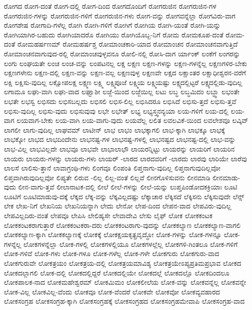 {ರೋಗದ
ರೋಗ-ದಂತೆ
ರೋಗ-ದಲ್ಲಿ
ರೋಗ-ದಿಂದ
ರೋಗದೊಂದಿಗೆ
ರೋಗರುಜಿನ
ರೋಗರುಜಿನ-ಗಳ
ರೋಗರುಜಿನ-ಗಳನ್ನು
ರೋಗರುಜಿನ-ಗಳಿಗೆ
ರೋಗರುಜಿನ-ಗಳು
ರೋಗ-ವನ್ನು
ರೋಗವನ್ನೆಲ್ಲಾ
ರೋಗವಿರು-ವಾಗ
ರೋಗಶೇಷ
ರೋಗಾದಿ-ಗಳೆಲ್ಲ
ರೋಗಿ
ರೋಗಿ-ಗಳಿಗೆ
ರೋಗಿಗೆ
ರೋಗಿಯ
ರೋಗಿ-ಯಂತೆ
ರೋಗಿ-ಯನ್ನು
ರೋಗಿಯಾಗಿರ-ಬಹುದು
ರೋಗಿಯಾದರೊ
ರೋಗಿಯು
ರೋಗಿಯೊಬ್ಬ-ನಿಗೆ
ರೋಮ
ರೋಮಕೂಪ-ದಂತೆ
ರೋಮ-ದಂತೆ
ರೋಮಹರ್ಷಣಮ್
ರೋಮಹರ್ಷಶ್ಚ
ರೋಮಾಂಚಕಾರಿ-ಯಾದ
ರೋಮಾಂಚನ
ರೋಮಾಂಚನವಾಗುತ್ತಿದೆ
ರೋಮಾಂಚನವಾಗುವುದ-ರಲ್ಲಿ
ರೋಮಾಂಚವುಳ್ಳವನೂ
ರೋಲಿ-ನಲ್ಲಿ
ರೋಸಿ-ದಾಗ
ರ್ಯಾಂಕ್
ಲಂಕೆಗೆ
ಲಂಗರನ್ನು
ಲಂಗು
ಲಂಘಯತೇ
ಲಂಚ
ಲಂಚ-ವನ್ನು
ಲಂಪಟನಲ್ಲ
ಲಕ್ಷ
ಲಕ್ಷಣ
ಲಕ್ಷಣ-ಗಳನ್ನು
ಲಕ್ಷಣ-ಗಳನ್ನೆಲ್ಲ
ಲಕ್ಷಣಗಳಿರ-ಬೇಕು
ಲಕ್ಷಣಗಳೇನು
ಲಕ್ಷಣ-ದಲ್ಲಿ
ಲಕ್ಷಣ-ವನ್ನು
ಲಕ್ಷಣ-ವಲ್ಲ
ಲಕ್ಷಣವುಳ್ಳ
ಲಕ್ಷಣವೇ
ಲಕ್ಷದ
ಲಕ್ಷಾಂತರ
ಲಕ್ಷಾಧೀಶ್ವರನ-ವರೆಗೆ
ಲಕ್ಷಿ
ಲಕ್ಷಿಸು-ವುದಿಲ್ಲ
ಲಕ್ಷೋಪಲಕ್ಷ
ಲಕ್ಷ್ಮಣ
ಲಕ್ಷ್ಮಿ
ಲಕ್ಷ್ಮಿಪೂಜೆ
ಲಕ್ಷ್ಮಿಯ
ಲಕ್ಷ್ಮಿಯಷ್ಟು
ಲಕ್ಷ್ಯದಲ್ಲಿಟ್ಟರೆ
ಲಕ್ಷ್ಯದಲ್ಲಿಡು-ವುದಿಲ್ಲ
ಲಗಾಮೂ
ಲಘು-ವಾಗಿ
ಲಘು-ವಾದ
ಲಘ್ವಾಶೀ
ಲಜ್ಜೆ-ಯಿಂದ
ಲಜ್ಜೆಯಿಲ್ಲ
ಲಟು
ಲಬ್ಧ
ಲಬ್ಧಮಿದಂ
ಲಬ್ಧ್ವಾ
ಲಭಂತೇ
ಲಭತೇ
ಲಭಸ್ವ
ಲಭಿಸದು
ಲಭಿಸಬಲ್ಲದು
ಲಭಿಸಲಿ
ಲಭಿಸ-ಲಿಲ್ಲ
ಲಭಿಸಿದರೂ
ಲಭಿಸಿದೆ
ಲಭಿಸು-ತ್ತದೆ
ಲಭಿಸು-ತ್ತವೆ
ಲಭಿಸು-ವುದಿಲ್ಲ
ಲಭಿಸು-ವುದು
ಲಭಿಸುವುವು
ಲಭೇ
ಲಭೇತ್
ಲಭ್ಯ
ಲಭ್ಯಸ್ತ್ವನನ್ಯಯಾ
ಲಯ-ಗಳಿಗೆ
ಲಯ-ದಲ್ಲಿ
ಲಯ-ವಾಗ
ಲಯವಾಗ-ಬೇಕು
ಲಯ-ವಾಗಿ
ಲಯ-ವಾಗು-ವುದು
ಲಯವೆಲ್ಲ
ಲಲಿತ
ಲವಲವಿಕೆ-ಯಿಂದ
ಲವಲೇಶವೂ
ಲವ್ಕಿವ್
ಲಾಗಲೀ
ಲಾಗು-ವುದಿಲ್ಲ
ಲಾಘವಮ್
ಲಾಟೀನ್
ಲಾಭ
ಲಾಭಂ
ಲಾಭಕ್ಕಾಗಲಿ
ಲಾಭ-ಕ್ಕಾಗಿ
ಲಾಭಕ್ಕೂ
ಲಾಭಕ್ಕೆ
ಲಾಭಕ್ಕೋ
ಲಾಭದ
ಲಾಭದಿಂದೇನು
ಲಾಭನಷ್ಟ-ಗಳ
ಲಾಭನಷ್ಟ-ಗಳಲ್ಲಿ
ಲಾಭನಷ್ಟದ
ಲಾಭನಷ್ಟ-ದಲ್ಲಿ
ಲಾಭ-ವನ್ನು
ಲಾಭ-ವಿಲ್ಲ
ಲಾಭವಿಲ್ಲದೇ
ಲಾಭವೂ
ಲಾಭವೇ
ಲಾಭಾಲಾಭೌ
ಲಾಯರನ್ನಿಟ್ಟು
ಲಾಯರನ್ನು
ಲಾಯರಿಗೆ
ಲಾಯರಿನ
ಲಾಯರು
ಲಾಯರು-ಗಳನ್ನು
ಲಾಯರು-ಗಳು
ಲಾಯರ್
-ಲಾರದ
ಲಾರದವರಿಗೆ
-ಲಾರದು
ಲಾರವು
ಲಾರಿಯೇ
ಲಾರೆವು
ಲಾಲಸೆ
ಲಾಲಿಸು-ತ್ತಾನೆ
ಲಾವಾಗ್ರಂಥಿ-ಗಳು
ಲಿಂಗವೂ
ಲಿಂಪಂತಿ
ಲಿಪ್ತನಾಗು-ವುದಿಲ್ಲ
ಲಿಪ್ತನಾಗುವುದಿಲ್ಲವೋ
ಲಿಪ್ತವಾಗಿರುವುದಿಲ್ಲವೋ
ಲಿಪ್ಯತೇ
ಲಿರುವ
-ಲಿಲ್ಲ
ಲಿಲ್ಲ-ವಂತೆ
ಲಿಲ್ಲವೆ
ಲೀನಗೊಳಿಸುವನು
ಲೀನಮಾಡಿ
ಲೀನಮಾಡು-ವುದು
ಲೀನ-ವಾಗು-ತ್ತವೆ
ಲೀಲಾನಾಟಕ-ದಲ್ಲಿ
ಲೀಲೆ
ಲೀಲೆ-ಗಳನ್ನು
ಲೀಲೆ-ಯನ್ನು
ಲುಪ್ತಪಿಂಡೋದಕಕ್ರಿಯಾಃ
ಲೂಟಿ
ಲೂಟಿಗೆ
ಲೂಟಿಮಾಡುವು-ದಕ್ಕೆ
ಲೆಕ್ಕದ
ಲೆಕ್ಕ-ವನ್ನು
ಲೆಕ್ಕವಿಲ್ಲದಷ್ಟು
ಲೆಕ್ಕಾಚಾರ
ಲೆಕ್ಕಿಸದೆ
ಲೆಕ್ಕಿಸನು
ಲೆಕ್ಕಿಸುವುದೇ
ಲೆನ್ಸ್
ಲೇಕ
ಲೇಖ-ನಿಗೆ
ಲೇಖನಿಯ
ಲೇಖನಿಯನ್ನಾಗಿ
ಲೇದು
ಲೇನೋ
ಲೇಪ-ದಿಂದ
ಲೇಪನ-ವಾದ
ಲೇಪವಿರು-ವುದಿಲ್ಲ
ಲೇಪವಿಲ್ಲದಿರು-ವಂತೆ
ಲೇಪವೂ
ಲೇಪಿಸಿ
ಲೇಲಿಹ್ಯಸೇ
ಲೇವಾದೇವಿ
ಲೇಸು
ಲೈಫ್
ಲೋಕ
ಲೋಕಕಂಟಕ
ಲೋಕಕಂಟಕರಾಗುತ್ತಾರೆ
ಲೋಕಕಂಟಕರಾ-ದರು
ಲೋಕಕಂಟರಾಗು-ವುದನ್ನು
ಲೋಕಕಲ್ಯಾಣ
ಲೋಕಕಲ್ಯಾಣ-ವಾಗಲಿ
ಲೋಕಕಲ್ಯಾಣ-ಕ್ಕಾಗಿ
ಲೋಕಕಲ್ಯಾಣಕ್ಕೆ
ಲೋಕಕ್ಕೆ
ಲೋಕಕ್ಷಯಕೃತ್ಪ್ರವೃದ್ಧೋ
ಲೋಕ-ಗಳನ್ನು
ಲೋಕ-ಗಳನ್ನೂ
ಲೋಕ-ಗಳನ್ನೆಲ್ಲ
ಲೋಕಗಳನ್ನೆಲ್ಲಾ
ಲೋಕ-ಗಳಲ್ಲಿ
ಲೋಕಗಳಲ್ಲಿಯೂ
ಲೋಕಗಳಲ್ಲೆಲ್ಲ
ಲೋಕಗಳಿ-ಗಿಂತಲೂ
ಲೋಕ-ಗಳಿಗೆ
ಲೋಕ-ಗಳಿವೆ
ಲೋಕ-ಗಳು
ಲೋಕ-ಗಳೂ
ಲೋಕ-ಗಳೆಲ್ಲ
ಲೋಕ-ಗಳೇ
ಲೋಕಗುರು
ಲೋಕಗುರು-ವಾದ
ಲೋಕಗುರುವೇ
ಲೋಕತ್ರಯಂ
ಲೋಕತ್ರಯ-ದಲ್ಲಿ
ಲೋಕತ್ರಯಮಾವಿಶ್ಯ
ಲೋಕತ್ರಯೇಽಪ್ಯಪ್ರತಿಮಪ್ರಭಾವ
ಲೋಕದ
ಲೋಕದಲ್ಲಾಗಲಿ
ಲೋಕ-ದಲ್ಲಿ
ಲೋಕದಲ್ಲಿದ್ದರೆ
ಲೋಕದಲ್ಲಿಯೇ
ಲೋಕದಲ್ಲೆ
ಲೋಕದಲ್ಲೊ
ಲೋಕದಿಂದಲೂ
ಲೋಕಪಾಲಕ-ನಾದ
ಲೋಕಮಹೇಶ್ವರಮ್
ಲೋಕಮಿಮಂ
ಲೋಕಲೀಲೆಯ
ಲೋಕ-ವನ್ನು
ಲೋಕವನ್ನೆಲ್ಲ
ಲೋಕವನ್ನೇ
ಲೋಕ-ವಿಲ್ಲ
ಲೋಕವಿಲ್ಲ-ವೆಂದು
ಲೋಕವೂ
ಲೋಕ-ವೆಂದರೆ
ಲೋಕವೇ
ಲೋಕವೋ
ಲೋಕವ್ಯವಹಾರದ
ಲೋಕಸಂಗ್ರಹ
ಲೋಕಸಂಗ್ರಹ-ಕ್ಕಾಗಿ
ಲೋಕಸಂಗ್ರಹಕ್ಕೆ
ಲೋಕಸಂಗ್ರಹದ
ಲೋಕಸಂಗ್ರಹಮೇವಾಪಿ
ಲೋಕಸಂಗ್ರಹ-ವಾದ
}
